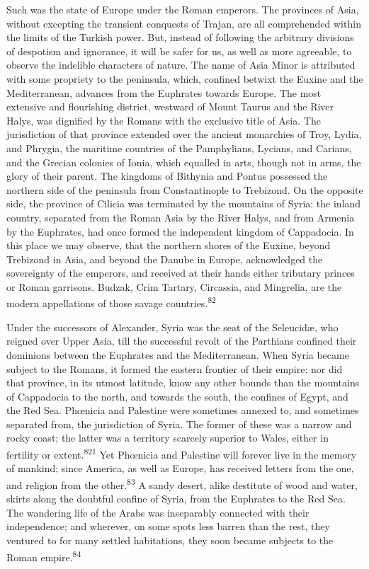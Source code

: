 Such was the state of Europe under the Roman emperors. The
provinces of Asia, without excepting the transient conquests of
Trajan, are all comprehended within the limits of the Turkish
power. But, instead of following the arbitrary divisions of
despotism and ignorance, it will be safer for us, as well as more
agreeable, to observe the indelible characters of nature. The
name of Asia Minor is attributed with some propriety to the
peninsula, which, confined betwixt the Euxine and the
Mediterranean, advances from the Euphrates towards Europe. The
most extensive and flourishing district, westward of Mount Taurus
and the River Halys, was dignified by the Romans with the
exclusive title of Asia. The jurisdiction of that province
extended over the ancient monarchies of Troy, Lydia, and Phrygia,
the maritime countries of the Pamphylians, Lycians, and Carians,
and the Grecian colonies of Ionia, which equalled in arts, though
not in arms, the glory of their parent. The kingdoms of Bithynia
and Pontus possessed the northern side of the peninsula from
Constantinople to Trebizond. On the opposite side, the province
of Cilicia was terminated by the mountains of Syria: the inland
country, separated from the Roman Asia by the River Halys, and
from Armenia by the Euphrates, had once formed the independent
kingdom of Cappadocia. In this place we may observe, that the
northern shores of the Euxine, beyond Trebizond in Asia, and
beyond the Danube in Europe, acknowledged the sovereignty of the
emperors, and received at their hands either tributary princes or
Roman garrisons. Budzak, Crim Tartary, Circassia, and Mingrelia,
are the modern appellations of those savage countries.\textsuperscript{82}


Under the successors of Alexander, Syria was the seat of the
Seleucidæ, who reigned over Upper Asia, till the successful
revolt of the Parthians confined their dominions between the
Euphrates and the Mediterranean. When Syria became subject to the
Romans, it formed the eastern frontier of their empire: nor did
that province, in its utmost latitude, know any other bounds than
the mountains of Cappadocia to the north, and towards the south,
the confines of Egypt, and the Red Sea. Phœnicia and Palestine
were sometimes annexed to, and sometimes separated from, the
jurisdiction of Syria. The former of these was a narrow and rocky
coast; the latter was a territory scarcely superior to Wales,
either in fertility or extent.\textsuperscript{821} Yet Phœnicia and Palestine
will forever live in the memory of mankind; since America, as
well as Europe, has received letters from the one, and religion
from the other.\textsuperscript{83} A sandy desert, alike destitute of wood and
water, skirts along the doubtful confine of Syria, from the
Euphrates to the Red Sea. The wandering life of the Arabs was
inseparably connected with their independence; and wherever, on
some spots less barren than the rest, they ventured to for many
settled habitations, they soon became subjects to the Roman
empire.\textsuperscript{84}


